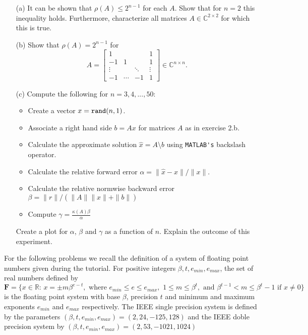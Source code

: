 \documentclass[10pt]{report}
\begin{document}
\begin{enumerate}
  \begin{enumerate}
    \item[(a)] It can be shown that $\rho(A)\leq 2^{n-1}$ for each $A$. Show that for $n=2$ this inequality holds. Furthermore, characterize all matrices $A\in\mathbb{C}^{2\times 2}$ for which this is true.
    \item[(b)] Show that $\rho(A)=2^{n-1}$ for
    \[A=\left[\begin{array}{rccc}1&&&1\\-1&1&&1\\\vdots&&\ddots&\vdots\\-1&\cdots&-1&1\end{array}\right]\in\mathbb{C}^{n\times n}.\]
    \item[(c)]Compute the following for $n=3,4,...,50$:
      \begin{itemize}
        \item Create a vector $x=\verb+rand+(n,1)$.
        \item Associate a right hand side $b=Ax$ for matrices $A$ as in exercise 2.b.
        \item Calculate the approximate solution $\hat{x}=A\setminus b$ using \verb+MATLAB's+ backslash operator.
        \item Calculate the relative forward error $\alpha=\|\hat{x}-x\|/\|x\|$.
        \item Calculate the relative normwise backward error $\beta=\|r\|/(\|A\|\|\hat{x}\|+\|b\|)$
        \item Compute $\gamma=\frac{\kappa(A)\beta}{\alpha}$
        \end{itemize}
        Create a plot for $\alpha$, $\beta$ and $\gamma$ as a function of $n$. Explain the outcome of this experiment.
    \end{enumerate}

\vspace{0.1cm} 


For the following problems we recall the definition of a  system of floating point numbers  given during the tutorial. For positive integers $\beta, t, e_{min}, e_{max}$, the set of real numbers defined by
\[\mathbf{F}= \{ x \in \mathbb{R}:\,  x = \pm m \beta^{e-t}, \text{ where } e_{min} \leq e \leq e_{max}, \,\,  1 \leq m \leq \beta^t, \text{ and } \beta^{t-1}< m \leq \beta^t -1 \text{ if } x \neq 0\}\]
is the floating point system with base $\beta$, precision $t$ and minimum and maximum exponents $e_{min}$ and $e_{max}$ respectively. The IEEE single precision system is defined by the parameters $(\beta, t, e_{min}, e_{max})=(2,24,-125,128)$ and the IEEE doble precision system by $(\beta, t, e_{min}, e_{max})=(2,53,-1021,1024)$


\end{enumerate}
\end{document}
